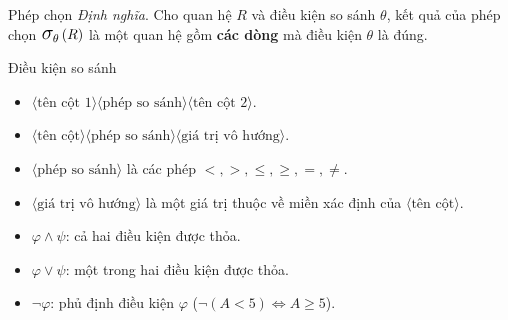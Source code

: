 \documentclass[11pt]{beamer}
\newcommand{\mmm}[1]{\mathlarger{\mathlarger{\mathlarger#1}}}%
\newcommand{\psig}[2]{\mmm{\sigma}_{#1}\left(#2\right)}%
\begin{document}
  \begin{frame}{Phép chọn}
  \textit{Định nghĩa}. Cho quan hệ $R$ và điều kiện so sánh $\theta$, kết quả của 
  phép chọn $\psig{\theta}{R}$ là một quan hệ gồm \textbf{các dòng} mà điều kiện $\theta$ là đúng.
  \end{frame}
  \begin{frame}{Điều kiện so sánh}
    \begin{itemize}
      \item<2-> $\langle\text{tên cột 1}\rangle\langle\text{phép so sánh}\rangle\langle\text{tên cột 2}\rangle$.
      \item<3-> $\langle\text{tên cột}\rangle\langle\text{phép so sánh}\rangle\langle\text{giá trị vô hướng}\rangle$.
    \end{itemize}
  \end{frame}
  \begin{frame}
    \begin{itemize}
      \item<2-> $\langle\text{phép so sánh}\rangle$ là các phép $<, >, \leq, \geq, =, \neq$.
      \item<3-> $\langle\text{giá trị vô hướng}\rangle$ là một giá trị thuộc về miền xác định của $\langle\text{tên cột}\rangle$.
    \end{itemize}
  \end{frame}
  \begin{frame}
    \begin{itemize}
      \item<2-> $\varphi \wedge \psi$: cả hai điều kiện được thỏa.
      \item<3-> $\varphi \vee \psi$: một trong hai điều kiện được thỏa.
      \item<4-> $\neg \varphi$: phủ định điều kiện $\varphi$ ($\neg (A < 5) \Leftrightarrow A \geq 5$).
    \end{itemize}
  \end{frame}
\end{document}
